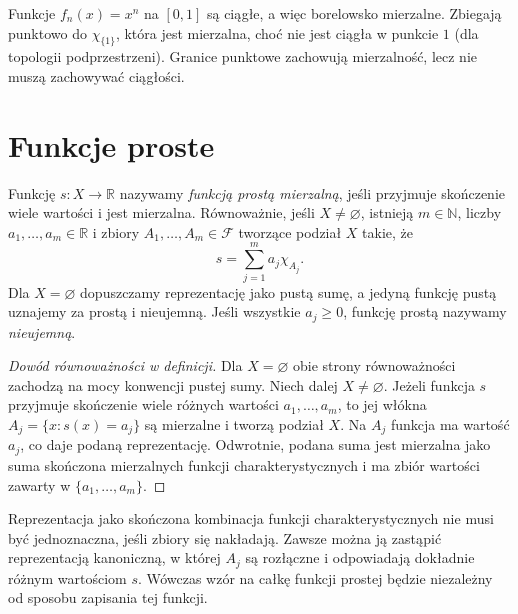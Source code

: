 \begin{przyklad}
Funkcje $f_n(x)=x^n$ na $[0,1]$ są ciągłe,
a więc borelowsko mierzalne. Zbiegają punktowo do
$\chi_{\{1\}}$, która jest mierzalna, choć
nie jest ciągła w punkcie $1$ (dla topologii podprzestrzeni).
Granice punktowe zachowują mierzalność, lecz nie muszą
zachowywać ciągłości.
\end{przyklad}

\section{Funkcje proste}

\begin{definicja}
\label{def:simple-function}
Funkcję $s:X\to\mathbb R$ nazywamy
\emph{funkcją prostą mierzalną}, jeśli przyjmuje
skończenie wiele wartości i jest mierzalna.
Równoważnie, jeśli $X\ne\varnothing$, istnieją $m\in\mathbb N$,
liczby $a_1,\ldots,a_m\in\mathbb R$ i zbiory
$A_1,\ldots,A_m\in\mathcal F$ tworzące podział $X$
takie, że
\[
s=\sum_{j=1}^m a_j\chi_{A_j}.
\]
Dla $X=\varnothing$ dopuszczamy reprezentację jako pustą sumę,
a jedyną funkcję pustą uznajemy za prostą i nieujemną.
Jeśli wszystkie $a_j\ge0$, funkcję prostą nazywamy
\emph{nieujemną}.
\end{definicja}

\begin{proof}[Dowód równoważności w definicji]
Dla $X=\varnothing$ obie strony równoważności zachodzą
na mocy konwencji pustej sumy. Niech dalej $X\ne\varnothing$.
Jeżeli funkcja $s$ przyjmuje skończenie wiele różnych
wartości $a_1,\ldots,a_m$, to jej włókna
$A_j=\{x:s(x)=a_j\}$ są mierzalne i tworzą
podział $X$. Na $A_j$ funkcja ma wartość $a_j$,
co daje podaną reprezentację. Odwrotnie, podana suma
jest mierzalna jako suma skończona mierzalnych funkcji
charakterystycznych i ma zbiór wartości zawarty w
$\{a_1,\ldots,a_m\}$.
\end{proof}

\begin{uwaga}
Reprezentacja jako skończona kombinacja funkcji
charakterystycznych nie musi być jednoznaczna, jeśli
zbiory się nakładają. Zawsze można ją zastąpić
reprezentacją kanoniczną, w której $A_j$ są rozłączne
i odpowiadają dokładnie różnym wartościom $s$.
Wówczas wzór na całkę funkcji prostej będzie
niezależny od sposobu zapisania tej funkcji.
\end{uwaga}

